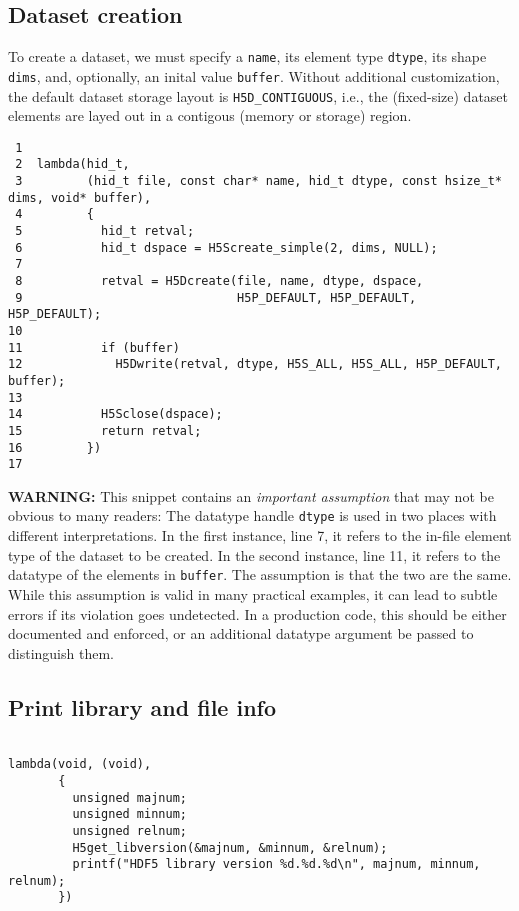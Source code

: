 \documentclass[a4paper, 12pt]{article}
\begin{document}
\subsection{Dataset creation \label{org343c5be}}
\label{sec:org54f3ff3}

To create a dataset, we must specify a \texttt{name}, its element type \texttt{dtype}, its
shape \texttt{dims}, and, optionally, an inital value \texttt{buffer}. Without additional
customization, the default dataset storage layout is \texttt{H5D\_CONTIGUOUS}, i.e.,
the (fixed-size) dataset elements are layed out in a contigous (memory or
storage) region.

\begin{verbatim}
 1
 2  lambda(hid_t,
 3         (hid_t file, const char* name, hid_t dtype, const hsize_t* dims, void* buffer),
 4         {
 5           hid_t retval;
 6           hid_t dspace = H5Screate_simple(2, dims, NULL);
 7
 8           retval = H5Dcreate(file, name, dtype, dspace,
 9                              H5P_DEFAULT, H5P_DEFAULT, H5P_DEFAULT);
10
11           if (buffer)
12             H5Dwrite(retval, dtype, H5S_ALL, H5S_ALL, H5P_DEFAULT, buffer);
13
14           H5Sclose(dspace);
15           return retval;
16         })
17
\end{verbatim}

\textbf{\textbf{WARNING:}} This snippet contains an \emph{important assumption} that may not be
obvious to many readers: The datatype handle \texttt{dtype} is used in two places with
different interpretations. In the first instance, line 7, it refers
to the in-file element type of the dataset to be created. In the second
instance, line 11, it refers to the datatype of the elements in
\texttt{buffer}. The assumption is that the two are the same. While this assumption is
valid in many practical examples, it can lead to subtle errors if its violation
goes undetected. In a production code, this should be either documented and
enforced, or an additional datatype argument be passed to distinguish them.

\subsection{Print library and file info}
\label{sec:orgd242fa4}

\begin{verbatim}

lambda(void, (void),
       {
         unsigned majnum;
         unsigned minnum;
         unsigned relnum;
         H5get_libversion(&majnum, &minnum, &relnum);
         printf("HDF5 library version %d.%d.%d\n", majnum, minnum, relnum);
       })

\end{verbatim}
\end{document}
